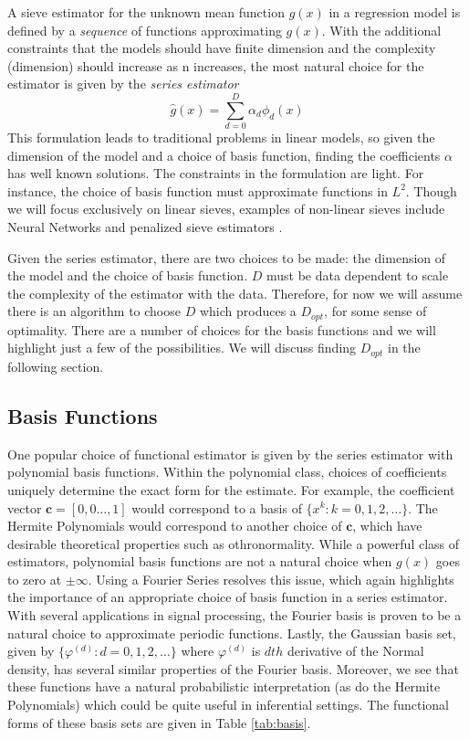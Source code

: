 \documentclass[12pt]{article}  %
\begin{document}
A sieve estimator for the unknown mean function $g(x)$ in a regression model is defined by a \textit{sequence} of functions approximating $g(x)$. With the additional constraints that the models should have finite dimension and the complexity (dimension) should increase as n increases, the most natural choice for the estimator is given by the \textit{series estimator} 
$$ \hat{g}(x) = \sum_{d=0}^{D} \alpha_{d} \phi_{d}(x)$$ 
This formulation leads to traditional problems in linear models, so given the dimension of the model and a choice of basis function, finding the coefficients $\alpha$ has well known solutions. The constraints in the formulation are light. For instance, the choice of basis function must approximate functions in $L^2$. Though we will focus exclusively on linear sieves, examples of non-linear sieves include Neural Networks and penalized sieve estimators \cite{Chen}. 

Given the series estimator, there are two choices to be made: the dimension of the model and the choice of basis function.  $D$ must be data dependent to scale the complexity of the estimator with the data. Therefore, for now we will assume there is an algorithm to choose $D$ which produces a $D_{opt}$, for some sense of optimality. There are a number of choices for the basis functions and we will highlight just a few  of the possibilities. We will discuss finding $D_{opt}$ in the following section. 

\subsection{Basis Functions}

One popular choice of functional estimator is given by the series estimator with polynomial basis functions. Within the polynomial class, choices of coefficients uniquely determine the exact form for the estimate. For example, the coefficient vector $\textbf{c} = [0,0 \ldots, 1]$ would correspond to a basis of $\{x^{k}: k = 0,1,2,\ldots\}$. The Hermite Polynomials would correspond to another choice of $\textbf{c}$, which have desirable theoretical properties such as othronormality. While a powerful class of estimators, polynomial basis functions are not a natural choice when $g(x)$ goes to zero at $\pm \infty$. Using a Fourier Series resolves this issue, which again highlights the importance of an appropriate choice of basis function in a series estimator. With several applications in signal processing, the Fourier basis is proven to be a natural choice to approximate periodic functions. Lastly, the Gaussian basis set, given by $\{\varphi^{(d)}:d= 0,1,2,\dots\}$ where $\varphi^{(d)}$ is $dth$ derivative of the Normal density, has several similar properties of the Fourier basis. Moreover, we see that these functions have a natural probabilistic interpretation (as do the Hermite Polynomials) which could be quite useful in inferential settings. The functional forms of these basis sets are given in Table \ref{tab:basis}. 
\end{document}
